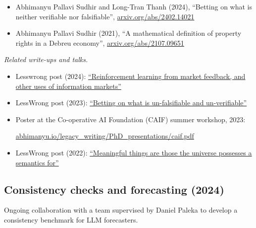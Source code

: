 \documentclass{article}
\newenvironment{relatedwork}
   {
     \begin{mdframed}[
       leftmargin=1cm,
       rightmargin=0cm,
       innerleftmargin=10pt,
       innerrightmargin=0pt,
       innertopmargin=0.5em,
       innerbottommargin=0.5em,
       linewidth=1pt,
       linecolor=gray,
       topline=false,
       bottomline=false,
       rightline=false
     ]
     \footnotesize
   }
   {
     \end{mdframed}
   }
\begin{document}
\begin{itemize}

    \item
          Abhimanyu Pallavi Sudhir and Long-Tran Thanh (2024), ``Betting on what is neither verifiable nor falsifiable'', \href{https://arxiv.org/abs/2402.14021}{arxiv.org/abs/2402.14021}

    \item
          Abhimanyu Pallavi Sudhir (2021),
          ``A mathematical definition of property rights in a Debreu economy'',
          \href{https://arxiv.org/abs/2107.09651}{arxiv.org/abs/2107.09651}

\end{itemize}

\begin{relatedwork}
    \emph{Related write-ups and talks.}
    \begin{itemize}[label=—]
        \item Lesswrong post (2024): \href{https://www.lesswrong.com/posts/Y79tkWhvHi8GgLN2q/reinforcement-learning-from-market-feedback-and-other-uses}{``Reinforcement learning from market feedback, and other uses of information markets''} 
        \item LessWrong post (2023): \href{https://www.lesswrong.com/posts/id84oe3LxdzoqinKA/betting-on-what-is-un-falsifiable-and-un-verifiable}{``Betting on what is un-falsifiable and un-verifiable''}
        \item Poster at the Co-operative AI Foundation (CAIF) summer workshop, 2023:

              \href{https://abhimanyu.io/legacy_writing/PhD_presentations/caif.pdf}{abhimanyu.io/legacy\_writing/PhD\_presentations/caif.pdf}
        \item LessWrong post (2022): \href{https://www.lesswrong.com/posts/xqxXrAohXSD3akYCg/meaningful-things-are-those-the-universe-possesses-a}{``Meaningful things are those the universe possesses a semantics for''}
    \end{itemize}
\end{relatedwork}

\subsection*{Consistency checks and forecasting (2024)}

Ongoing collaboration with a team supervised by Daniel Paleka to develop a consistency benchmark for LLM forecasters.
\end{document}
